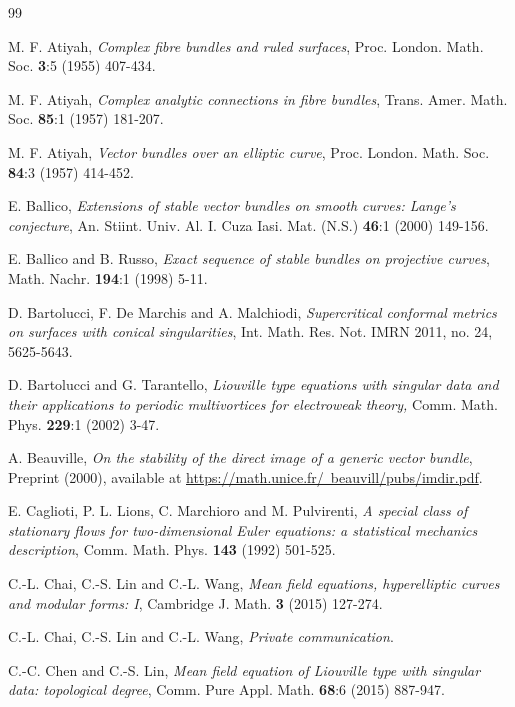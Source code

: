 \documentclass[12pt]{article}
\begin{document}
\small
\begin{thebibliography}{99}

  M. F. Atiyah, \emph{Complex fibre bundles and ruled surfaces}, Proc. London. Math. Soc. {\bf 3}:5 (1955) 407-434.

  M. F. Atiyah, \emph{Complex analytic connections in fibre bundles}, Trans. Amer. Math. Soc. {\bf 85}:1 (1957) 181-207.

   M. F. Atiyah, \emph{Vector bundles over an elliptic curve}, Proc. London. Math. Soc. {\bf 84}:3 (1957) 414-452.

  E. Ballico, \emph{Extensions of stable vector bundles on smooth curves: Lange's conjecture}, An. Stiint. Univ. Al. I. Cuza Iasi. Mat. (N.S.) {\bf 46}:1 (2000) 149-156.

  E. Ballico and B. Russo, \emph{Exact sequence of stable bundles on projective curves},
 Math. Nachr. {\bf 194}:1 (1998) 5-11.

  D. Bartolucci, F. De Marchis and A. Malchiodi, \emph{Supercritical conformal metrics on surfaces with conical singularities}, Int. Math. Res. Not. IMRN 2011, no. 24, 5625-5643.

  D. Bartolucci and G. Tarantello, \emph{Liouville type equations with singular data and their applications to periodic multivortices for electroweak theory,} Comm. Math. Phys. {\bf 229}:1 (2002) 3-47.
 
  A. Beauville, \emph{On the stability of the direct image of a generic vector bundle}, Preprint (2000), available at \href{https://math.unice.fr/~beauvill/pubs/imdir.pdf}{https://math.unice.fr/~beauvill/pubs/imdir.pdf}.

   E. Caglioti, P. L. Lions, C. Marchioro and M. Pulvirenti, \emph{A special class of stationary flows for two-dimensional Euler equations: a statistical mechanics description}, Comm. Math. Phys. {\bf 143} (1992) 501-525.

   C.-L. Chai, C.-S. Lin and C.-L. Wang, \emph{Mean field equations, hyperelliptic curves and modular forms: I}, Cambridge J. Math. {\bf 3} (2015) 127-274.

   C.-L. Chai, C.-S. Lin and C.-L. Wang, \emph{Private communication}.

   C.-C. Chen and C.-S. Lin, \emph{Mean field equation of Liouville type with singular data: topological degree}, Comm. Pure Appl. Math.  {\bf 68}:6 (2015) 887-947.


\end{thebibliography}
\end{document}

